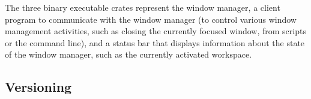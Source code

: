 The  three binary  executable  crates  represent the  window  manager, a  client
program  to communicate  with  the  window manager  (to  control various  window
management  activities,  such as  closing  the  currently focused  window,  from
scripts or the  command line), and a status bar  that displays information about
the state of the window manager, such as the currently activated workspace.

\subsection{Versioning}
{ \textcolor{gray}\blindtext }
